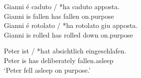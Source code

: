 \documentclass[output=paper]{langsci/langscibook}
\begin{document}
\ea\label{ex:key:10.25}  \parencite{FolliHarley2006}
    \ea
	\gll    Gianni é  caduto  /  *ha  caduto  apposta.\\
            Gianni is fallen {} \hphantom{*}has  fallen    on.purpose\\
    \ex
	\gll    Gianni é rotolato  /  *ha  rotolato  giu  apposta.\\
            Gianni is rolled {} \hphantom{*}has  rolled    down  on.purpose\\
    \z
\z

\ea\label{ex:key:10.26} 
    \sn
    \gll    Peter ist / *hat  absichtlich  eingeschlafen.\\
            Peter is {} \hphantom{*}has  deliberately fallen.asleep\\
    \glt    ‘Peter fell asleep on purpose.’
\z
\end{document}
